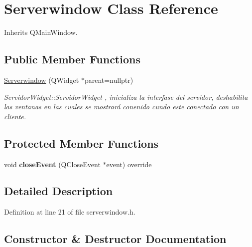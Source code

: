 \hypertarget{class_serverwindow}{}\section{Serverwindow Class Reference}
\label{class_serverwindow}


Inherits Q\+Main\+Window.

\subsection*{Public Member Functions}
\begin{DoxyCompactItemize}
\item 
\hyperlink{class_serverwindow_abfd7341ed8ca374dc60bc1aec121dbfb}{Serverwindow} (Q\+Widget $\ast$parent=nullptr)
\begin{DoxyCompactList}\small\item\em Servidor\+Widget\+::\+Servidor\+Widget , inicializa la interfase del servidor, deshabilita las ventanas en las cuales se mostrará conenido cundo este conectado con un cliente. \end{DoxyCompactList}\end{DoxyCompactItemize}
\subsection*{Protected Member Functions}
\begin{DoxyCompactItemize}
\item 
\mbox{\label{class_serverwindow_aeb42a899102b7baf297ca39115518c9f}} 
void {\bfseries close\+Event} (Q\+Close\+Event $\ast$event) override
\end{DoxyCompactItemize}


\subsection{Detailed Description}


Definition at line 21 of file serverwindow.\+h.



\subsection{Constructor \& Destructor Documentation}
\mbox{\label{class_serverwindow_abfd7341ed8ca374dc60bc1aec121dbfb}} 
